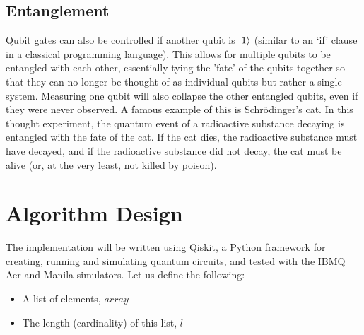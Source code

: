 \documentclass[12pt]{article}
\begin{document}
\subsection{Entanglement}
Qubit gates can also be controlled if another qubit is $\ket{1}$ (similar to an `if' clause in a classical programming language). This allows for multiple qubits to be entangled with each other, essentially tying the 'fate' of the qubits together so that they can no longer be thought of as individual qubits but rather a single system. Measuring one qubit will also collapse the other entangled qubits, even if they were never observed. A famous example of this is Schr\"odinger's cat. In this thought experiment, the quantum event of a radioactive substance decaying is entangled with the fate of the cat. If the cat dies, the radioactive substance must have decayed, and if the radioactive substance did not decay, the cat must be alive (or, at the very least, not killed by poison).

\section{Algorithm Design}
The implementation will be written using Qiskit, a Python framework for creating, running and simulating quantum circuits, and tested with the IBMQ Aer and Manila simulators.
Let us define the following:

\begin{itemize}
    \item A list of elements, $array$
    \item The length (cardinality) of this list, $l$
\end{itemize}
\end{document}
